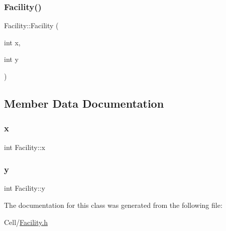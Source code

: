 \subsubsection{\texorpdfstring{Facility()}{Facility()}}
{\footnotesize\ttfamily Facility\+::\+Facility (\begin{DoxyParamCaption}\item[{int}]{x,  }\item[{int}]{y }\end{DoxyParamCaption})}



\subsection{Member Data Documentation}
\mbox{\label{classFacility_a97a4d1f6f807e0e74c4283cf120daed9}} 
\subsubsection{\texorpdfstring{x}{x}}
{\footnotesize\ttfamily int Facility\+::x\hspace{0.3cm}{\ttfamily [protected]}}

\mbox{\label{classFacility_a28d1fbfe0699e800db094161504b0e44}} 
\subsubsection{\texorpdfstring{y}{y}}
{\footnotesize\ttfamily int Facility\+::y\hspace{0.3cm}{\ttfamily [protected]}}



The documentation for this class was generated from the following file\+:\begin{DoxyCompactItemize}
\item 
Cell/\mbox{\hyperlink{Facility_8h}{Facility.\+h}}\end{DoxyCompactItemize}
